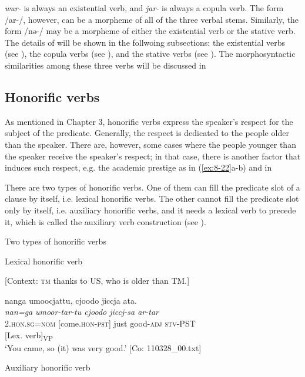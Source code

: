 \textit{wur-} is always an existential verb, and \textit{jar-} is always a copula verb. The form /ar-/, however, can be a morpheme of all of the three verbal stems. Similarly, the form /nə-/ may be a morpheme of either the existential verb or the stative verb. The details of  will be shown in the follwoing subsections: the existential verbs (see ), the copula verbs (see ), and the stative verbs (see ). The morphosyntactic similarities among these three verbs will be discussed in 

\subsection{Honorific verbs}

As mentioned in Chapter 3, honorific verbs express the speaker’s respect for the subject of the predicate. Generally, the respect is dedicated to the people older than the speaker. There are, however, some cases where the people younger than the speaker receive the speaker’s respect; in that case, there is another factor that induces such respect, e.g. the academic prestige as in (\ref{ex:8-22}a-b) and  in 

There are two types of honorific verbs. One of them can fill the predicate slot of a clause by itself, i.e. lexical honorific verbs. The other cannot fill the predicate slot only by itself, i.e. auxiliary honorific verbs, and it needs a lexical verb to precede it, which is called the auxiliary verb construction (see ).

\ea\label{ex:8-21}
  Two types of honorific verbs

\ea Lexical honorific verb

    [Context: \textsc{tm} thanks to US, who is older than TM.]

{\TM}
\gllll  nanga  umoocjattu,  {\textbar}cjoodo{\textbar}  jiccja  ata.\\
\textit{nan=ga}  \textit{umoor-tar-tu  cjoodo  jiccj-sa  ar-tar}\\
2.\textsc{hon}.\textsc{sg}=\textsc{nom}  [come.\textsc{hon}-\textsc{pst}]  just  good-\textsc{adj}  \textsc{stv}-PST\\
        {}[Lex. verb]\textsubscript{VP}      \\
\glt ‘You came, so (it) was very good.’ [Co: 110328\_00.txt]

\ex Auxiliary honorific verb


